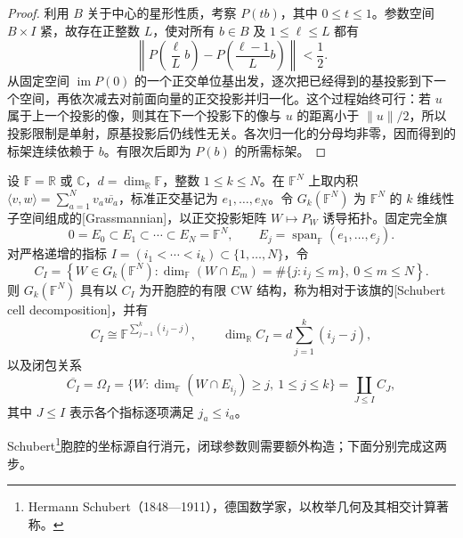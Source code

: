 \begin{proof}
	利用 \(B\) 关于中心的星形性质，考察 \(P(tb)\)，其中 \(0\leq t\leq1\)。参数空间 \(B\times I\) 紧，故存在正整数 \(L\)，使对所有 \(b\in B\) 及 \(1\leq\ell\leq L\) 都有
	\[
		\left\|P\left(\frac{\ell}{L}b\right)-P\left(\frac{\ell-1}{L}b\right)\right\|<\frac12.
	\]
	从固定空间 \(\operatorname{im}P(0)\) 的一个正交单位基出发，逐次把已经得到的基投影到下一个空间，再依次减去对前面向量的正交投影并归一化。这个过程始终可行：若 \(u\) 属于上一个投影的像，则其在下一个投影下的像与 \(u\) 的距离小于 \(\|u\|/2\)，所以投影限制是单射，原基投影后仍线性无关。各次归一化的分母均非零，因而得到的标架连续依赖于 \(b\)。有限次后即为 \(P(b)\) 的所需标架。
\end{proof}

\begin{theorem}
	\label{g2:thm:grassmann-schubert-cw}
	设 \(\mathbb F=\mathbb R\) 或 \(\mathbb C\)，\(d=\dim_{\mathbb R}\mathbb F\)，整数 \(1\leq k\leq N\)。在 \(\mathbb F^N\) 上取内积 \(\langle v,w\rangle=\sum_{a=1}^N v_a\overline{w_a}\)，标准正交基记为 \(e_1,\ldots,e_N\)。令 \(G_k(\mathbb F^N)\) 为 \(\mathbb F^N\) 的 \(k\) 维线性子空间组成的[Grassmannian]，以正交投影矩阵 \(W\mapsto P_W\) 诱导拓扑。固定完全旗
	\[
		0=E_0\subset E_1\subset\cdots\subset E_N=\mathbb F^N,
		\qquad E_j=\operatorname{span}_{\mathbb F}(e_1,\ldots,e_j).
	\]
	对严格递增的指标 \(I=(i_1<\cdots<i_k)\subset\{1,\ldots,N\}\)，令
	\[
		C_I=\left\{W\in G_k(\mathbb F^N):\dim_{\mathbb F}(W\cap E_m)=\#\{j:i_j\leq m\},\ 0\leq m\leq N\right\}.
	\]
	则 \(G_k(\mathbb F^N)\) 具有以 \(C_I\) 为开胞腔的有限 CW 结构，称为相对于该旗的[Schubert cell decomposition]，并有
	\[
		C_I\cong\mathbb F^{\sum_{j=1}^k(i_j-j)},\qquad
		\dim_{\mathbb R}C_I=d\sum_{j=1}^k(i_j-j),
	\]
	以及闭包关系
	\[
		\overline{C_I}=\Omega_I
		=\{W:\dim_{\mathbb F}(W\cap E_{i_j})\geq j,\ 1\leq j\leq k\}
		=\coprod_{J\leq I}C_J,
	\]
	其中 \(J\leq I\) 表示各个指标逐项满足 \(j_a\leq i_a\)。
\end{theorem}

Schubert\footnote{Hermann Schubert（1848—1911），德国数学家，以枚举几何及其相交计算著称。}胞腔的坐标源自行消元，闭球参数则需要额外构造；下面分别完成这两步。

